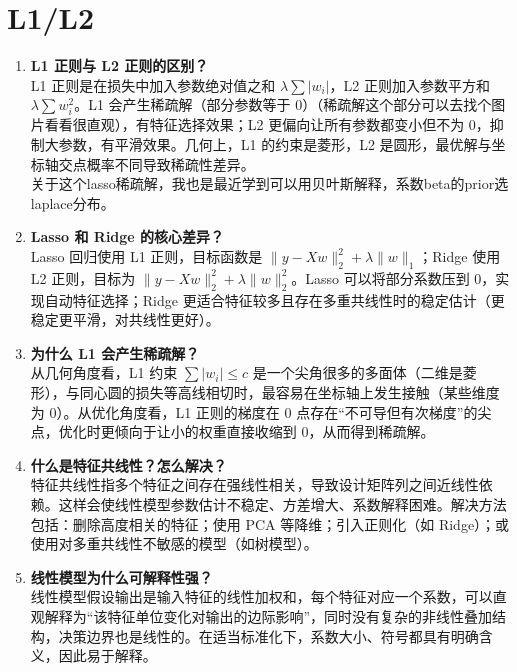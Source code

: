 \documentclass{article}
\begin{document}
\section{L1/L2}
\begin{enumerate}
\item \textbf{L1 正则与 L2 正则的区别？}\\
L1 正则是在损失中加入参数绝对值之和 $\lambda \sum |w_i|$，L2 正则加入参数平方和 $\lambda \sum w_i^2$。L1 会产生稀疏解（部分参数等于 0）（稀疏解这个部分可以去找个图片看看很直观），有特征选择效果；L2 更偏向让所有参数都变小但不为 0，抑制大参数，有平滑效果。几何上，L1 的约束是菱形，L2 是圆形，最优解与坐标轴交点概率不同导致稀疏性差异。\\
关于这个lasso稀疏解，我也是最近学到可以用贝叶斯解释，系数beta的prior选laplace分布。

\item \textbf{Lasso 和 Ridge 的核心差异？}\\
Lasso 回归使用 L1 正则，目标函数是 $\|y - Xw\|_2^2 + \lambda \|w\|_1$；Ridge 使用 L2 正则，目标为 $\|y - Xw\|_2^2 + \lambda \|w\|_2^2$。Lasso 可以将部分系数压到 0，实现自动特征选择；Ridge 更适合特征较多且存在多重共线性时的稳定估计（更稳定更平滑，对共线性更好）。

\item \textbf{为什么 L1 会产生稀疏解？}\\
从几何角度看，L1 约束 $\sum|w_i|\le c$ 是一个尖角很多的多面体（二维是菱形），与同心圆的损失等高线相切时，最容易在坐标轴上发生接触（某些维度为 0）。从优化角度看，L1 正则的梯度在 0 点存在“不可导但有次梯度”的尖点，优化时更倾向于让小的权重直接收缩到 0，从而得到稀疏解。

\item \textbf{什么是特征共线性？怎么解决？}\\
特征共线性指多个特征之间存在强线性相关，导致设计矩阵列之间近线性依赖。这样会使线性模型参数估计不稳定、方差增大、系数解释困难。解决方法包括：删除高度相关的特征；使用 PCA 等降维；引入正则化（如 Ridge）；或使用对多重共线性不敏感的模型（如树模型）。

\item \textbf{线性模型为什么可解释性强？}\\
线性模型假设输出是输入特征的线性加权和，每个特征对应一个系数，可以直观解释为“该特征单位变化对输出的边际影响”，同时没有复杂的非线性叠加结构，决策边界也是线性的。在适当标准化下，系数大小、符号都具有明确含义，因此易于解释。
\end{enumerate}
\end{document}
